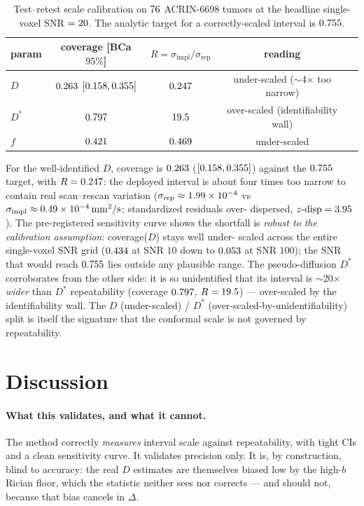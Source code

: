 \documentclass[11pt]{article}
\newcommand{\Dstar}{D^{*}}
\newcommand{\sigimp}{\sigma_{\mathrm{impl}}}
\newcommand{\sigrep}{\sigma_{\mathrm{rep}}}
\begin{document}
\begin{table}[h]\centering\small
\begin{tabular}{lcccc}
\toprule
param & coverage [BCa $95\%$] & $R=\sigimp/\sigrep$ & reading \\
\midrule
$D$      & $0.263$ $[0.158,0.355]$ & $0.247$   & under-scaled ($\sim$4$\times$ too narrow) \\
$\Dstar$ & $0.797$                       & $19.5$ & over-scaled (identifiability wall) \\
$f$      & $0.421$                           & $0.469$   & under-scaled \\
\bottomrule
\end{tabular}
\caption{Test--retest scale calibration on $76$ ACRIN-6698 tumors at the headline
single-voxel SNR $=20$. The analytic target for a correctly-scaled interval is
$0.755$.}
\end{table}

For the well-identified $D$, coverage is $0.263$ ($[0.158,0.355]$) against the
$0.755$ target, with $R=0.247$: the deployed interval is about four times too narrow
to contain real scan--rescan variation ($\sigrep\approx\numSigRep\times10^{-4}$ vs
$\sigimp\approx\numSigImpl\times10^{-4}\,\mathrm{mm^2/s}$; standardized residuals over-
dispersed, $z\text{-disp}=3.95$). The pre-registered sensitivity curve shows the
shortfall is \emph{robust to the calibration assumption}: coverage($D$) stays well under-
scaled across the entire single-voxel SNR grid ($0.434$ at SNR $10$ down to
$0.053$ at SNR $100$); the SNR that would reach $0.755$ lies outside any
plausible range. The pseudo-diffusion $\Dstar$ corroborates from the other side: it is so
unidentified that its interval is $\sim$20$\times$ \emph{wider} than $\Dstar$ repeatability
(coverage $0.797$, $R=19.5$) --- over-scaled by the identifiability wall. The
$D$ (under-scaled) / $\Dstar$ (over-scaled-by-unidentifiability) split is itself the
signature that the conformal scale is not governed by repeatability.

\section{Discussion}\label{sec:disc}
\paragraph{What this validates, and what it cannot.} The method correctly \emph{measures}
interval scale against repeatability, with tight CIs and a clean sensitivity curve. It
validates precision only. It is, by construction, blind to accuracy: the real $D$ estimates
are themselves biased low by the high-$b$ Rician floor, which the statistic neither sees nor
corrects --- and should not, because that bias cancels in $\Delta$.
\end{document}
